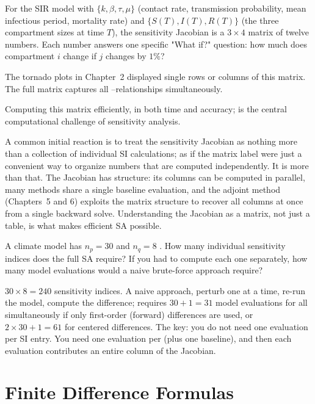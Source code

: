 For the SIR model with \POIs $\{k, \beta, \tau, \mu\}$
(contact rate, transmission probability, mean infectious period,
mortality rate) and \QOIs $\{S(T), I(T), R(T)\}$ (the three
compartment sizes at time $T$), the sensitivity Jacobian is a
$3 \times 4$ matrix of twelve numbers.
Each number answers one specific "What if?" question:
how much does compartment $i$ change if \POI $j$ changes by $1\%$?

The tornado plots in Chapter~2 displayed single rows or columns
of this matrix. The full matrix captures all
\POI--\QOI relationships simultaneously.

Computing this matrix efficiently, in both time and accuracy;
is the central computational challenge of sensitivity analysis.

A common initial reaction is to treat the sensitivity Jacobian as
nothing more than a collection of individual SI calculations;
as if the matrix label were just a convenient way to organize numbers
that are computed independently. It is more than that.
The Jacobian has structure: its columns can be computed in parallel,
many methods share a single baseline evaluation, and the adjoint
method (Chapters~5 and 6) exploits the matrix structure to recover
all columns at once from a single backward solve. Understanding the
Jacobian as a matrix, not just a table, is what makes efficient SA possible.

\begin{selfcheck}
A climate model has $n_p = 30$ \POIs and $n_q = 8$ \QOIs.
How many individual sensitivity indices does the full SA require?
If you had to compute each one separately, how many model
evaluations would a naive brute-force approach require?
\end{selfcheck}
\begin{scAnswer}
$30 \times 8 = 240$ sensitivity indices. A naive approach, perturb
one \POI at a time, re-run the model, compute the difference;
requires $30 + 1 = 31$ model evaluations for all \POIs simultaneously
if only first-order (forward) differences are used, or
$2 \times 30 + 1 = 61$ for centered differences.
The key: you do not need one evaluation per SI entry. You need one
evaluation per \POI (plus one baseline), and then each evaluation
contributes an entire column of the Jacobian.
\end{scAnswer}

\section{Finite Difference Formulas}
\label{sec:finitediff}

